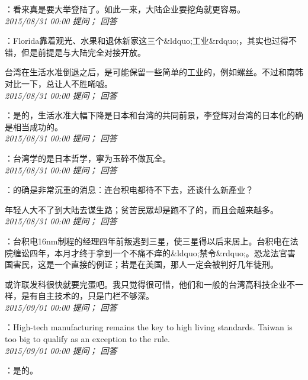 \documentclass[twocolumn]{ctexart}
\begin{document}
：看来真是要大举登陆了。如此一来，大陆企业要挖角就更容易。\\

\textit{\hfill\noindent\small 2015/08/31 00:00 提问； 回答}

：Florida靠着观光、水果和退休新家这三个\&ldquo;工业\&rdquo;，其实也过得不错，但是前提是与大陆完全对接开放。

台湾在生活水准倒退之后，是可能保留一些简单的工业的，例如螺丝。不过和南韩对比一下，总让人不胜唏嘘。\\

\textit{\hfill\noindent\small 2015/08/31 00:00 提问； 回答}

：是的，生活水准大幅下降是日本和台湾的共同前景，李登辉对台湾的日本化的确是相当成功的。\\

\textit{\hfill\noindent\small 2015/08/31 00:00 提问； 回答}

：台湾学的是日本哲学，寧为玉碎不做瓦全。\\

\textit{\hfill\noindent\small 2015/08/31 00:00 提问； 回答}

：的确是非常沉重的消息：连台积电都待不下去，还谈什么新產业？

年轻人大不了到大陆去谋生路；贫苦民眾却是跑不了的，而且会越来越多。\\

\textit{\hfill\noindent\small 2015/08/31 00:00 提问； 回答}

：台积电16nm制程的经理四年前叛逃到三星，使三星得以后来居上。台积电在法院缠讼四年，本月才终于拿到一个不痛不痒的\&ldquo;禁令\&rdquo;。恐龙法官害国害民，这是一个直接的例证；若是在美国，那人一定会被判好几年徒刑。

或许联发科很快就要完蛋吧。我只觉得很可惜，他们和一般的台湾高科技企业不一样，是有自主技术的，只是门栏不够深。\\

\textit{\hfill\noindent\small 2015/09/01 00:00 提问； 回答}

：High-tech manufacturing remains the key to high living standards. Taiwan is too big to qualify as an exception to the rule.\\

\textit{\hfill\noindent\small 2015/09/01 00:00 提问； 回答}

：是的。
\end{document}
